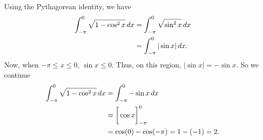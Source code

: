 \documentclass[]{ximera}
\begin{document}
\begin{freeResponse}
Using the Pythagorean identity, we have
\begin{align*}
		\int_{- \pi}^0 \sqrt{1 - \cos^2 x} \mathop{}\!d x
		&= \int_{- \pi}^0 \sqrt{\sin^2 x} \mathop{}\!d x  \\
		&= \int_{- \pi}^0 | \sin x | \mathop{}\!d x.
		\end{align*}
	Now, when $-\pi \leq x \leq 0$, $\sin x \leq 0$.  
	Thus, on this region, $|\sin x | = - \sin x$.
	So we continue
		\begin{align*}
		\int_{- \pi}^0 \sqrt{1 - \cos^2 x} \mathop{}\!d x
		&= \int_{- \pi}^0 - \sin x \mathop{}\!d x  \\
		&= \bigg[ \cos x \bigg]_{-\pi}^0  \\
		&= \cos(0) - \cos(-\pi) = 1 - (-1) = 2.
		\end{align*}
\end{freeResponse}
\end{document}

